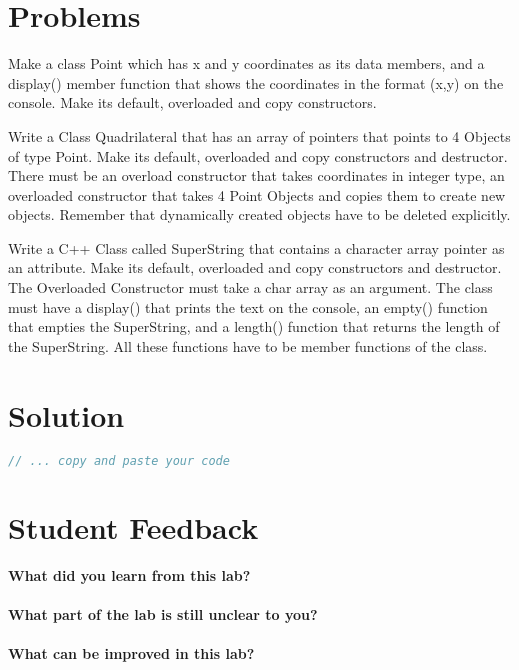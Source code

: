 \documentclass[11pt,fleqn]{book} %
\begin{document}
\newpage
\section{Problems}

\begin{problem} Make a class Point which has x and y coordinates as its data members, and a display() member function that shows the coordinates in the format (x,y) on the console. Make its default, overloaded and copy constructors. \\
\end{problem}
\begin{problem} Write a Class Quadrilateral that has an array of pointers that points to 4 Objects of type Point. Make its default, overloaded and copy constructors and destructor. There must be an overload constructor that takes coordinates in integer type, an overloaded constructor that takes 4 Point Objects and copies them to create new objects. Remember that dynamically created objects have to be deleted explicitly. \\
\end{problem}
\begin{problem} Write a C++ Class called SuperString that contains a character array pointer as an attribute. Make its default, overloaded and copy constructors and destructor. The Overloaded Constructor must take a char array as an argument. The class must have a display() that prints the text on the console, an empty() function that empties the SuperString, and a length() function that returns the length of the SuperString. All these functions have to be member functions of the class.
\end{problem}

\newpage
\section{Solution}
\begin{lstlisting}[language=C++]
  // ... copy and paste your code
\end{lstlisting}

\newpage
\section{Student Feedback}
\textbf{What did you learn from this lab?}\\
\noindent\fbox{\parbox{\textwidth}{
  }
}\\
\textbf{What part of the lab is still unclear to you?}\\
\noindent\fbox{\parbox{\textwidth}{
  }
}\\
\textbf{What can be improved in this lab?}\\ 
\noindent\fbox{\parbox{\textwidth}{
  }
}\\
\end{document}
